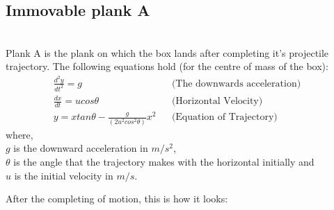 \documentclass[11pt]{article}
\begin{document}
\pagebreak

\subsection{Immovable plank A}
\setlength\fboxsep{2pt}
\setlength\fboxrule{1pt}
\\

Plank A  is the plank on which the box lands after completing it's projectile trajectory. The following equations hold \cite{hcv} (for the centre of mass of the box):
\begin{align}
\frac{d^2 y}{dt^2} = g &&\mbox{(The downwards acceleration)}&
\\
\frac{dx}{dt} = ucos\theta &&\mbox{(Horizontal Velocity)}&
\\
y = xtan\theta - \frac{g}{(2u^2 cos^2 \theta)}x^2 &&\mbox{(Equation of Trajectory)}&
\end{align}
where,\\
$g$ is the downward acceleration in $m/s^2$,\\
$\theta$ is the angle that the trajectory makes with the horizontal initially and\\
$u$ is the initial velocity in $m/s$.

After the completing of motion, this is how it looks: \\
\\
\setlength\fboxsep{2pt}
\setlength\fboxrule{1pt}
\\
\end{document}
